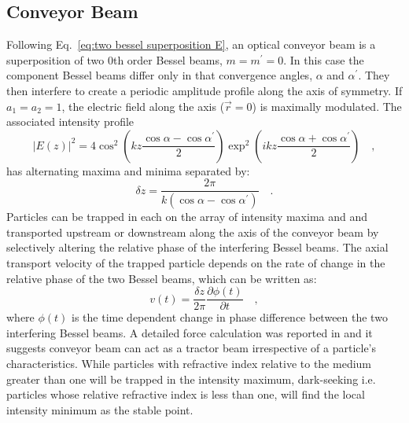 \subsection{Conveyor Beam}
Following Eq.~\eqref{eq:two bessel superposition E}, an optical conveyor beam is a superposition of two $0$th order Bessel beams, $m=m^{\prime} = 0$. In this case the component Bessel beams differ only in that convergence angles, $\alpha$ and $\alpha ^{\prime}$. They then interfere to create a periodic amplitude profile along the axis of symmetry. If $a_1 = a_2 = 1$, the electric field along the axis ($\vec{r}=0$) is maximally modulated. The associated intensity profile
\begin{equation}
\label{eq:conveyor electric field axis}
\vert E(z) \vert ^2 = 4 \cos ^2 \left( kz\frac{\cos \alpha - \cos \alpha ^{\prime}}{2}\right) \exp ^2 \left( ikz \frac{\cos \alpha + \cos \alpha ^{\prime}}{2}\right) \quad ,
\end{equation}
has alternating maxima and minima separated by:
\begin{equation}
\label{eq:conveyor period}
\delta z = \frac{2\pi}{k \left( \cos \alpha - \cos \alpha ^{\prime}\right)} \quad .
\end{equation}
Particles can be trapped in each on the array of intensity maxima and and transported upstream or downstream along the axis of the conveyor beam by selectively altering the relative phase of the interfering Bessel beams. The axial transport velocity of the trapped particle depends on the rate of change in the relative phase of the two Bessel beams, which can be written as:
\begin{equation}
\label{eq:conveyor velocity}
v(t) = \frac{\delta z}{2\pi}\frac{\partial \phi (t)}{\partial t} \quad ,
\end{equation}
where $\phi (t)$ is the time dependent change in phase difference between the two interfering Bessel beams. A detailed force calculation was reported in \cite{ruffner2012prl} and it suggests conveyor beam can act as a tractor beam irrespective of a particle's characteristics. While particles with refractive index relative to the medium greater than one will be trapped in the intensity maximum, dark-seeking i.e. particles whose relative refractive index is less than one, will find the local intensity minimum as the stable point.


